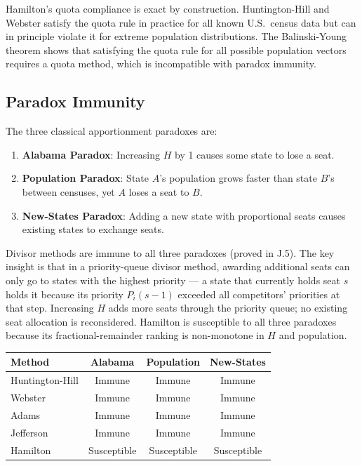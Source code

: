 Hamilton's quota compliance is exact by construction.
Huntington-Hill and Webster satisfy the quota rule in practice for
all known U.S.\ census data but can in principle violate it for
extreme population distributions.
The Balinski-Young theorem \citep{balinski1982fair} shows that
satisfying the quota rule for all possible population vectors
requires a quota method, which is incompatible with paradox immunity.

\subsection{Paradox Immunity}

The three classical apportionment paradoxes are:
\begin{enumerate}
  \item \textbf{Alabama Paradox}: Increasing $H$ by 1 causes some state
    to lose a seat.
  \item \textbf{Population Paradox}: State $A$'s population grows faster
    than state $B$'s between censuses, yet $A$ loses a seat to $B$.
  \item \textbf{New-States Paradox}: Adding a new state with proportional
    seats causes existing states to exchange seats.
\end{enumerate}

Divisor methods are immune to all three paradoxes (proved in J.5).
The key insight is that in a priority-queue divisor method,
awarding additional seats can only go to states with the highest
priority --- a state that currently holds seat $s$ holds it because
its priority $P_i(s-1)$ exceeded all competitors' priorities at that
step.
Increasing $H$ adds more seats through the priority queue;
no existing seat allocation is reconsidered.
Hamilton is susceptible to all three paradoxes because its
fractional-remainder ranking is non-monotone in $H$ and population.

\begin{center}
\begin{tabular}{lccc}
\toprule
Method & Alabama & Population & New-States \\
\midrule
Huntington-Hill & Immune & Immune & Immune \\
Webster         & Immune & Immune & Immune \\
Adams           & Immune & Immune & Immune \\
Jefferson       & Immune & Immune & Immune \\
Hamilton        & Susceptible & Susceptible & Susceptible \\
\bottomrule
\end{tabular}
\end{center}

